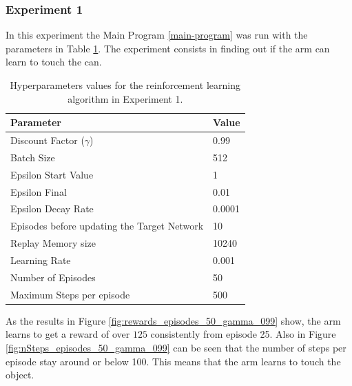 \documentclass[12pt,oneside]{article}
\begin{document}
\subsubsection{Experiment 1}\label{experiment:experiment-1}
In this experiment the Main Program \ref{main-program} was run with the parameters in Table \ref{tab:hyperparams-exp-1}. The experiment consists in finding out if the arm can learn to touch the can.
\begin{table}[h]
\centering
\begin{tabular}{l l}
\hline
Parameter & Value \\
\hline
Discount Factor ($\gamma$) & 0.99 \\
Batch Size & 512 \\
Epsilon Start Value & 1 \\
Epsilon Final & 0.01 \\
Epsilon Decay Rate & 0.0001 \\
Episodes before updating the Target Network & 10 \\
Replay Memory size & 10240 \\
Learning Rate & 0.001 \\
Number of Episodes & 50 \\
Maximum Steps per episode & 500 \\
\hline
\end{tabular}
\caption{Hyperparameters values for the reinforcement learning algorithm in Experiment 1.}
\label{tab:hyperparams-exp-1}
\end{table}

As the results in Figure \ref{fig:rewards_episodes_50_gamma_099} show, the arm learns to get a reward of over $125$ consistently from episode 25. Also in Figure \ref{fig:nSteps_episodes_50_gamma_099} can be seen that the number of steps per episode stay around or below 100. This means that the arm learns to touch the object.
\end{document}
